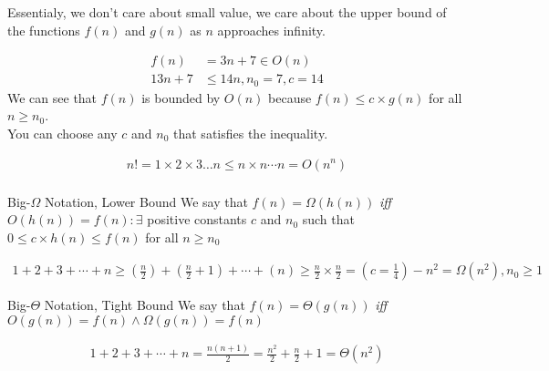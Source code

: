 Essentialy, we don't care about small value, we care about the upper bound of the functions $f(n)$ and $g(n)$ as $n$ approaches infinity.

\begin{example}
    \begin{align*}
        f(n) &= 3n + 7 \in O(n)\\
        13n + 7 &\leq 14n, n_0 = 7, c = 14
    \end{align*}
    We can see that $f(n)$ is bounded by $O(n)$ because $f(n) \leq c\times g(n)$ for all $n \geq n_0$. \\
    You can choose any $c$ and $n_0$ that satisfies the inequality.
\end{example}

\begin{example}
    \begin{align*}
        n! = 1\times 2 \times 3 \ldots n \leq n \times n \cdots n = O(n^n)\\
    \end{align*}
\end{example}

\begin{definition}
    {Big-$\Omega$ Notation, Lower Bound}
    We say that $f(n) = \Omega(h(n))$ \textit{iff} $O(h(n)) = f(n): \exists$ positive constants $c$ and $n_0$ such that $0 \leq c\times h(n) \leq f(n)$ for all $n \geq n_0$
\end{definition}

\begin{example}
    \begin{align*}
        1 + 2 + 3 + \cdots + n \geq (\frac{n}{2}) + (\frac{n}{2} + 1) + \cdots + (n) \geq \frac{n}{2}\times \frac{n}{2} = (c = \frac{1}{4}) - n^2 = \Omega(n^2), n_0 \geq 1
    \end{align*}
\end{example}

\begin{definition}
    {Big-$\Theta$ Notation, Tight Bound}
    We say that $f(n) = \Theta(g(n))$ \textit{iff} $O(g(n)) = f(n) \land \Omega(g(n)) = f(n)$
\end{definition}

\begin{example}
    \begin{align*}
        1 + 2 + 3 + \cdots + n = \frac{n(n+1)}{2} = 
        \frac{n^2}{2} + \frac{n}{2} + 1= \Theta(n^2)
    \end{align*}
\end{example}

